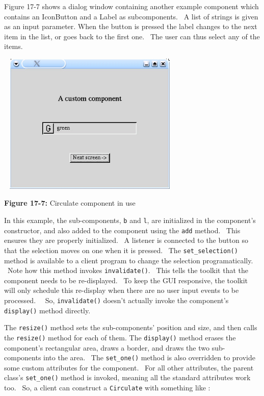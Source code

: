 Figure 17-7 shows a dialog window containing another example component
which contains an IconButton and a Label as subcomponents. \ A list of
strings is given as an input parameter. When the button is pressed the
label changes to the next item in the list, or goes back to the first
one. \ The user can thus select any of the items.

\begin{center}
\includegraphics[width=3.4992in,height=2.6543in]{ub-img/ub-img56.jpg}
\end{center}

{\sffamily\bfseries Figure 17-7:}
{\sffamily Circulate component in use}

\bigskip

In this example, the sub-components, \texttt{b} and \texttt{l}, are
initialized in the component's constructor, and also
added to the component using the \texttt{add} method. \ This ensures
they are properly initialized. \ A listener is connected to the button
so that the selection moves on one when it is pressed. \ The
\texttt{set\_selection()} method is available to a client program to
change the selection programatically. \ Note how this method invokes
\texttt{invalidate()}. \ This tells the toolkit that the component
needs to be re-displayed. \ To keep the GUI responsive, the toolkit
will only schedule this re-display when there are no user input events
to be processed. \ \ So, \texttt{invalidate()} doesn't
actually invoke the component's \texttt{display()}
method directly.

The \texttt{resize()} method sets the sub-components'
position and size, and then calls the \texttt{resize()} method for each
of them. The \texttt{display()} method erases the
component's rectangular area, draws a border, and
draws the two sub-components into the area. \ The \texttt{set\_one()}
method is also overridden to provide some custom attributes for the
component. \ For all other attributes, the parent
class's \texttt{set\_one()} method is invoked, meaning
all the standard attributes work too. \ So, a client can construct a
\texttt{Circulate} with something like :

